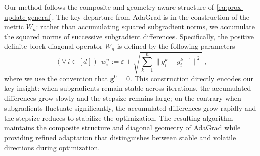 \documentclass[11pt]{article}
\theoremstyle{plain}
\theoremstyle{definition}
\theoremstyle{remark}
\newcommand{\norm}[1]{\lVert{#1}\rVert}
\newcommand{\m}{d}
\newcommand{\buu}{\bm{g}}
\newcommand{\uu}{g}
\newcommand{\w}{w}
\newcommand{\iter}{n}
\newcommand{\ite}{k}
\newcommand{\W}{W}
\begin{document}
\noindent
Our method follows the composite and geometry-aware structure of \eqref{eq:prox-update-general}. The key departure from AdaGrad is in the construction of the metric $\W_\iter$: rather than accumulating squared subgradient norms, we accumulate the squared norms of successive subgradient differences. 
Specifically, the positive definite block-diagonal operator $\W_\iter$ is defined by the following parameters
\begin{equation}\label{AdaDiff}
(\forall\,i\in [\m])\ \ \w_{i}^{\iter} := \varepsilon+\sqrt{\sum_{\ite=1}^\iter \norm{\uu_{i}^\ite - \uu_{i}^{\ite-1}}^2}\;, 
\end{equation}
\noindent
where we use the convention that $\buu^0 = 0$. This construction directly encodes our key insight: when subgradients remain stable across iterations, the accumulated differences grow slowly and the stepsize remains large; on the contrary when subgradients fluctuate significantly, the accumulated differences grow rapidly and the stepsize reduces to stabilize the optimization. 
The resulting algorithm maintains the composite structure and diagonal geometry of AdaGrad while providing refined adaptation that distinguishes between stable and volatile directions during optimization. 
\end{document}
